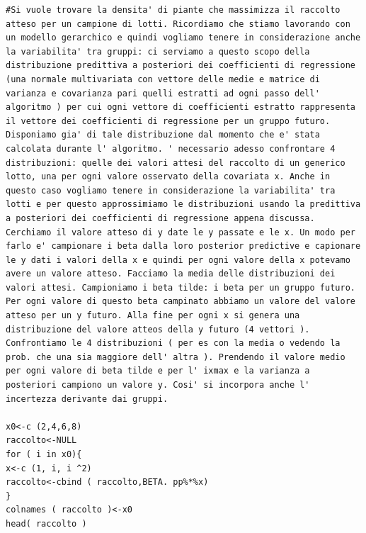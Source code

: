 \begin{lstlisting}[style=R]
#Si vuole trovare la densita' di piante che massimizza il raccolto atteso per un campione di lotti. Ricordiamo che stiamo lavorando con un modello gerarchico e quindi vogliamo tenere in considerazione anche la variabilita' tra gruppi: ci serviamo a questo scopo della distribuzione predittiva a posteriori dei coefficienti di regressione (una normale multivariata con vettore delle medie e matrice di varianza e covarianza pari quelli estratti ad ogni passo dell' algoritmo ) per cui ogni vettore di coefficienti estratto rappresenta il vettore dei coefficienti di regressione per un gruppo futuro. Disponiamo gia' di tale distribuzione dal momento che e' stata calcolata durante l' algoritmo. ' necessario adesso confrontare 4 distribuzioni: quelle dei valori attesi del raccolto di un generico lotto, una per ogni valore osservato della covariata x. Anche in questo caso vogliamo tenere in considerazione la variabilita' tra lotti e per questo approssimiamo le distribuzioni usando la predittiva a posteriori dei coefficienti di regressione appena discussa. Cerchiamo il valore atteso di y date le y passate e le x. Un modo per farlo e' campionare i beta dalla loro posterior predictive e capionare le y dati i valori della x e quindi per ogni valore della x potevamo avere un valore atteso. Facciamo la media delle distribuzioni dei valori attesi. Campioniamo i beta tilde: i beta per un gruppo futuro. Per ogni valore di questo beta campinato abbiamo un valore del valore atteso per un y futuro. Alla fine per ogni x si genera una distribuzione del valore atteos della y futuro (4 vettori ). Confrontiamo le 4 distribuzioni ( per es con la media o vedendo la prob. che una sia maggiore dell' altra ). Prendendo il valore medio per ogni valore di beta tilde e per l' ixmax e la varianza a posteriori campiono un valore y. Cosi' si incorpora anche l' incertezza derivante dai gruppi.

x0<-c (2,4,6,8)
raccolto<-NULL
for ( i in x0){
x<-c (1, i, i ^2)
raccolto<-cbind ( raccolto,BETA. pp%*%x)
}
colnames ( raccolto )<-x0
head( raccolto )
\end{lstlisting}


